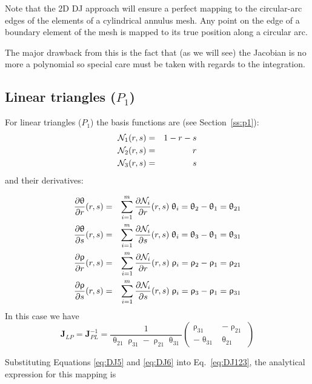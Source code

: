 Note that the 2D DJ approach will ensure a perfect mapping to the circular-arc edges of the 
elements of a cylindrical annulus mesh.
Any point on the edge of a boundary element of the mesh is mapped to its true position along 
a circular arc.

The major drawback from this is the fact that (as we will see) the Jacobian is no more a polynomial
so special care must be taken with regards to the integration.

\subsection{Linear triangles ($P_1$)}

For linear triangles ($P_1$) the basis functions are (see Section~\ref{ss:p1}):
\begin{eqnarray}
{\mathcal{N}}_1(r,s)&=&1-r-s \nonumber\\
{\mathcal{N}}_2(r,s)&=&r  \nonumber\\
{\mathcal{N}}_3(r,s)&=&s \nonumber
\end{eqnarray}
and their derivatives:


\begin{eqnarray}
\frac{\partial\uptheta}{\partial r}(r,s) &=& \sum_{i=1}^m \frac{\partial{\mathcal{N}}_i}{\partial r}(r,s)\; \uptheta_i = \uptheta_2-\uptheta_1 = \uptheta_{21}\nonumber\\
\frac{\partial\uptheta}{\partial s}(r,s) &=& \sum_{i=1}^m \frac{\partial{\mathcal{N}}_i}{\partial s}(r,s)\; \uptheta_i = \uptheta_3-\uptheta_1 = \uptheta_{31}\nonumber\\
\frac{\partial\uprho}{\partial r}(r,s)   &=& \sum_{i=1}^m \frac{\partial{\mathcal{N}}_i}{\partial r}(r,s)\; \uprho_i   = \uprho_2-\uprho_1 = \uprho_{21}\nonumber\\
\frac{\partial\uprho}{\partial s}(r,s)   &=& \sum_{i=1}^m \frac{\partial{\mathcal{N}}_i}{\partial s}(r,s)\; \uprho_i   = \uprho_3-\uprho_1 = \uprho_{31}\nonumber
\end{eqnarray}
In this case we have 
\begin{equation}
\boxed{
{\bm J}_{LP}={\bm J}_{PL}^{-1} = \frac{1}{\uptheta_{21}\uprho_{31}-\uprho_{21}\uptheta_{31}} 
\left(
\begin{array}{cc}
\uprho_{31} & -\uprho_{21} \\
-\uptheta_{31} & \uptheta_{21}
\end{array}
\right)}
\label{eq:DJ5}
\end{equation}

Substituting Equations \eqref{eq:DJ5} and \eqref{eq:DJ6} into Eq.~\eqref{eq:DJ123}, the analytical expression for this mapping is

